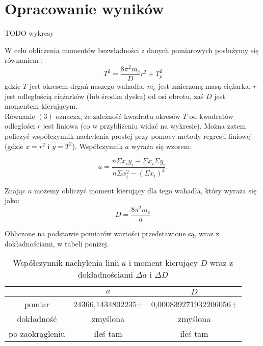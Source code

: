 \documentclass[10pt,a4paper]{article}
\newcommand{\forceindent}{\leavevmode{\parindent=3em\indent}}
\begin{document}
\section{Opracowanie wyników}
TODO wykresy

\forceindent W celu obliczenia momentów bezwładności z danych pomiarowych posłużymy się równaniem :
\begin{equation}
T^2 = \frac{8 \pi^2 m_c}{D}r^2 + T_p^2
\end{equation}
gdzie $T$ jest okresem drgań naszego wahadła, $m_c$ jest zmierzoną masą ciężarka, $r$ jest odległością ciężarków (lub środka dysku) od osi obrotu, zaś $D$ jest momentem kierującym.\\
\forceindent Równanie $(3)$ oznacza, że zależność kwadratu okresów $T$ od kwadratów odległości $r$ jest liniowa (co w przybliżeniu widać na wykresie). Można zatem policzyć współczynnik nachylenia prostej przy pomocy metody regresji liniowej (gdzie $x = r^2$ i $y = T^2$). Współczynnik $a$ wyraża się wzorem:

\begin{equation}
a=\frac{n\Sigma x_i y_i - \Sigma x_i \Sigma y_i}{n\Sigma x_i^2 - (\Sigma x_i)^2}.
\end{equation}

Znając $a$ możemy obliczyć moment kierujący dla tego wahadła, który wyraża się jako:
\begin{equation}
D = \frac{8\pi ^2 m_c}{a}
\end{equation}

Obliczone na podstawie pomiarów wartości przedstawione są, wraz z dokładnościami, w tabeli poniżej.

\begin{table}[!h]
\centering
\begin{tabular}{|cc||c|}
\multicolumn{1}{c}{} & \multicolumn{1}{c}{$a$} & \multicolumn{1}{c}{$D$}\\
\hline
pomiar & 24366,1434802235$\pm$& 0,000839271932206056$\pm$\\
\hline
dokładność & zmyślona & zmyślona\\
\hline
po zaokrągleniu & ileś tam  & ileś tam \\
\hline
\end{tabular}
\caption{Współczynnik nachylenia linii $a$ i moment kierujący $D$ wraz z dokładnościami $\Delta a$ i $\Delta D$}
\end{table}
\end{document}

